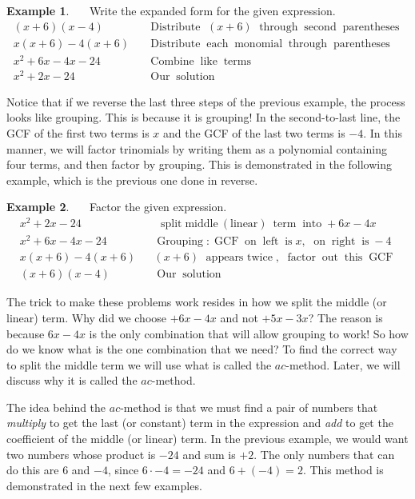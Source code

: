 \documentclass[12pt]{book}
\theoremstyle{definition}
\newtheorem{example}{Example}
\newcommand{\tmop}[1]{\ensuremath{\operatorname{#1}}}
\begin{document}
\begin{example}~~~Write the expanded form for the given expression.
  \begin{eqnarray*}
    (x + 6) (x - 4) &  & \tmop{Distribute~} (x + 6) \tmop{~through}
    \tmop{second} \tmop{parentheses}\\
    x (x + 6) - 4 (x + 6) &  & \tmop{Distribute} \tmop{each} \tmop{monomial}
    \tmop{through} \tmop{parentheses}\\
    x^2 + 6 x - 4 x - 24 &  & \tmop{Combine} \tmop{like} \tmop{terms}\\
    x^2 + 2 x - 24 &  & \tmop{Our} \tmop{solution}
  \end{eqnarray*}
\end{example}	
Notice that if we reverse the last three steps of the previous example, the process looks like grouping. This is because it is grouping! In the second-to-last line, the GCF of the first two terms is $x$ and the GCF of the last two terms is $- 4$. In this manner, we will factor
trinomials by writing them as a polynomial containing four terms, and then factor by grouping. This is demonstrated in the following example, which is the previous one done in reverse.
\begin{example}~~~Factor the given expression.
  \begin{eqnarray*}
    x^2 + 2 x - 24 &  & \tmop{~split} \tmop{middle~(linear)~} \tmop{term} \tmop{into} + 6
    x - 4 x\\
    x^2 + 6 x - 4 x - 24 &  & \tmop{Grouping} : \tmop{GCF} \tmop{on}
    \tmop{left} \tmop{is} x, \tmop{~on} \tmop{right} \tmop{is} - 4\\
    x (x + 6) - 4 (x + 6) &  & (x + 6) \tmop{~appears~twice},
    \tmop{~factor} \tmop{out} \tmop{this} \tmop{GCF}\\
    (x + 6) (x - 4) &  & \tmop{Our} \tmop{solution}
  \end{eqnarray*}
\end{example}
The trick to make these problems work resides in how we split the middle (or linear) term. Why did we choose $+ 6 x - 4 x$ and not $+ 5 x - 3 x$? The reason is because $6 x - 4 x$ is the only combination that will allow grouping to work!  So how do we know what is the one combination that we need? To find the correct way to split the middle term we will use what is called the $ac$-method. Later, we will discuss why
it is called the $ac$-method.\par
The idea behind the $ac$-method is that we must find a pair of numbers that {\it multiply} to get the last (or constant) term in the expression and {\it add} to get the coefficient of the middle (or linear) term.  In the previous example, we would want two numbers whose product is $- 24$ and sum is $+ 2$. The only numbers that can do this are $6$ and $-4$, since $6 \cdot - 4 = - 24$ and $6 + (- 4) = 2$. This method is demonstrated in the next few examples.
\end{document}
